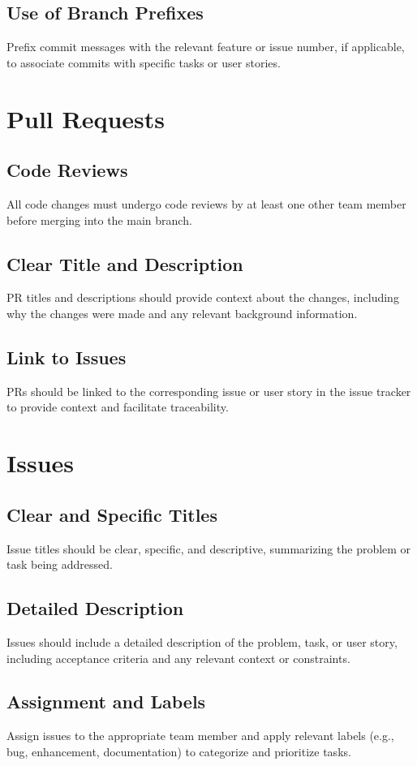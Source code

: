 \documentclass{article}
\begin{document}
\subsection{Use of Branch Prefixes}
Prefix commit messages with the relevant feature or issue number, if applicable, to associate commits with specific tasks or user stories.

\section{Pull Requests}
\subsection{Code Reviews}
All code changes must undergo code reviews by at least one other team member before merging into the main branch.
\subsection{Clear Title and Description}
PR titles and descriptions should provide context about the changes, including why the changes were made and any relevant background information.
\subsection{Link to Issues}
PRs should be linked to the corresponding issue or user story in the issue tracker to provide context and facilitate traceability.

\section{Issues}
\subsection{Clear and Specific Titles}
Issue titles should be clear, specific, and descriptive, summarizing the problem or task being addressed.
\subsection{Detailed Description}
Issues should include a detailed description of the problem, task, or user story, including acceptance criteria and any relevant context or constraints.
\subsection{Assignment and Labels}
Assign issues to the appropriate team member and apply relevant labels (e.g., bug, enhancement, documentation) to categorize and prioritize tasks.
\end{document}

